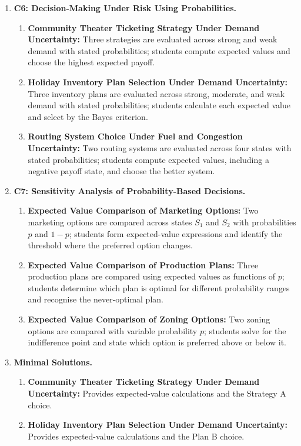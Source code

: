 	\begin{enumerate}
		\item \textbf{C6: Decision-Making Under Risk Using Probabilities.}
		\begin{enumerate}
			\item \textbf{Community Theater Ticketing Strategy Under Demand Uncertainty:} Three strategies are evaluated across strong and weak demand with stated probabilities; students compute expected values and choose the highest expected payoff.
			\item \textbf{Holiday Inventory Plan Selection Under Demand Uncertainty:} Three inventory plans are evaluated across strong, moderate, and weak demand with stated probabilities; students calculate each expected value and select by the Bayes criterion.
			\item \textbf{Routing System Choice Under Fuel and Congestion Uncertainty:} Two routing systems are evaluated across four states with stated probabilities; students compute expected values, including a negative payoff state, and choose the better system.
		\end{enumerate}
		\item \textbf{C7: Sensitivity Analysis of Probability-Based Decisions.}
		\begin{enumerate}
			\item \textbf{Expected Value Comparison of Marketing Options:} Two marketing options are compared across states $S_1$ and $S_2$ with probabilities $p$ and $1-p$; students form expected-value expressions and identify the threshold where the preferred option changes.
			\item \textbf{Expected Value Comparison of Production Plans:} Three production plans are compared using expected values as functions of $p$; students determine which plan is optimal for different probability ranges and recognise the never-optimal plan.
			\item \textbf{Expected Value Comparison of Zoning Options:} Two zoning options are compared with variable probability $p$; students solve for the indifference point and state which option is preferred above or below it.
		\end{enumerate}
		\item \textbf{Minimal Solutions.}
		\begin{enumerate}
			\item \textbf{Community Theater Ticketing Strategy Under Demand Uncertainty:} Provides expected-value calculations and the Strategy A choice.
			\item \textbf{Holiday Inventory Plan Selection Under Demand Uncertainty:} Provides expected-value calculations and the Plan B choice.

\end{enumerate}
\end{enumerate}
